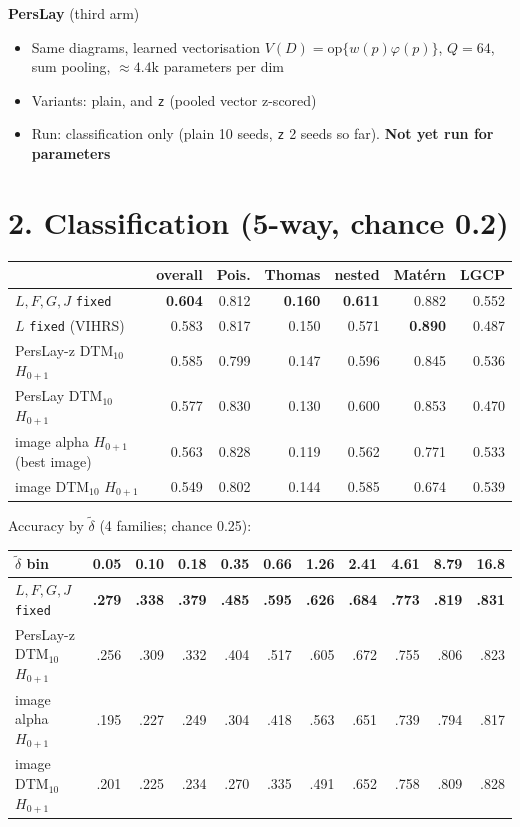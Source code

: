 \documentclass[10pt]{article}
\newcommand{\dt}{\tilde\delta}
\begin{document}
\textbf{PersLay} (third arm)
\begin{itemize}
  \item Same diagrams, learned vectorisation $V(D)=\mathrm{op}\{w(p)\varphi(p)\}$, $Q=64$, sum pooling, $\approx4.4$k parameters per dim
  \item Variants: plain, and \texttt{z} (pooled vector z-scored)
  \item Run: classification only (plain 10 seeds, \texttt{z} 2 seeds so far). \textbf{Not yet run for parameters}
\end{itemize}

\section*{2. Classification (5-way, chance 0.2)}

{\small
\begin{tabular}{@{}lrrrrrr@{}}
\toprule
 & overall & Pois. & Thomas & nested & Mat\'ern & LGCP \\
\midrule
$L,F,G,J$ \texttt{fixed}            & \textbf{0.604} & 0.812 & \textbf{0.160} & \textbf{0.611} & 0.882 & 0.552 \\
$L$ \texttt{fixed} (VIHRS)          & 0.583 & 0.817 & 0.150 & 0.571 & \textbf{0.890} & 0.487 \\
PersLay-z DTM$_{10}$ $H_{0+1}$      & 0.585 & 0.799 & 0.147 & 0.596 & 0.845 & 0.536 \\
PersLay DTM$_{10}$ $H_{0+1}$        & 0.577 & 0.830 & 0.130 & 0.600 & 0.853 & 0.470 \\
image alpha $H_{0+1}$ (best image)  & 0.563 & 0.828 & 0.119 & 0.562 & 0.771 & 0.533 \\
image DTM$_{10}$ $H_{0+1}$          & 0.549 & 0.802 & 0.144 & 0.585 & 0.674 & 0.539 \\
\bottomrule
\end{tabular}
}

\smallskip
Accuracy by $\dt$ (4 families; chance 0.25):

\smallskip
{\small
\begin{tabular}{@{}lrrrrrrrrrr@{}}
\toprule
$\dt$ bin & 0.05 & 0.10 & 0.18 & 0.35 & 0.66 & 1.26 & 2.41 & 4.61 & 8.79 & 16.8 \\
\midrule
$L,F,G,J$ \texttt{fixed}        & \textbf{.279} & \textbf{.338} & \textbf{.379} & \textbf{.485} & \textbf{.595} & \textbf{.626} & \textbf{.684} & \textbf{.773} & \textbf{.819} & \textbf{.831} \\
PersLay-z DTM$_{10}$ $H_{0+1}$  & .256 & .309 & .332 & .404 & .517 & .605 & .672 & .755 & .806 & .823 \\
image alpha $H_{0+1}$           & .195 & .227 & .249 & .304 & .418 & .563 & .651 & .739 & .794 & .817 \\
image DTM$_{10}$ $H_{0+1}$      & .201 & .225 & .234 & .270 & .335 & .491 & .652 & .758 & .809 & .828 \\
\bottomrule
\end{tabular}
}
\end{document}
